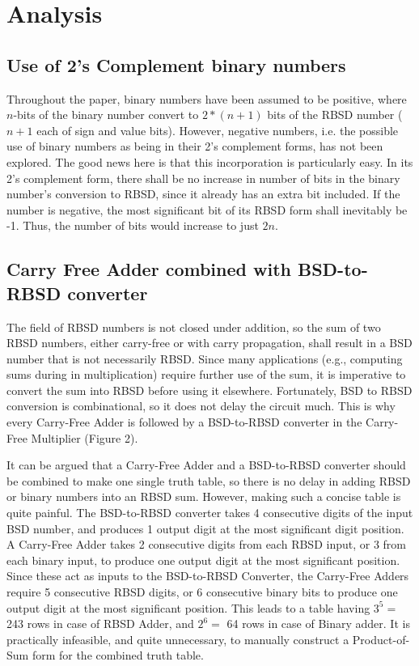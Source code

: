 \documentclass[conference]{IEEEtran_IBSS}
\begin{document}
\section{Analysis}

\subsection{Use of 2's Complement binary numbers}

Throughout the paper, binary numbers have been assumed to be positive, where $n$-bits of the binary number convert to $2*(n+1)$ bits of the RBSD number ($n+1$ each of sign and value bits). However, negative numbers, i.e. the possible use of binary numbers as being in their 2's complement forms, has not been explored. The good news here is that this incorporation is particularly easy. In its 2's complement form, there shall be no increase in number of bits in the binary number's conversion to RBSD, since it already has an extra bit included. If the number is negative, the most significant bit of its RBSD form shall inevitably be -1. Thus, the number of bits would increase to just $2n$.

\subsection{Carry Free Adder combined with BSD-to-RBSD converter}

The field of RBSD numbers is not closed under addition, so the sum of two RBSD numbers, either carry-free or with carry propagation, shall result in a BSD number that is not necessarily RBSD. Since many applications (e.g., computing sums during in multiplication) require further use of the sum, it is imperative to convert the sum into RBSD before using it elsewhere. Fortunately, BSD to RBSD conversion is combinational, so it does not delay the circuit much. This is why every Carry-Free Adder is followed by a BSD-to-RBSD converter in the Carry-Free Multiplier (Figure 2).

It can be argued that a Carry-Free Adder and a BSD-to-RBSD converter should be combined to make one single truth table, so there is no delay in adding RBSD or binary numbers into an RBSD sum. However, making such a concise table is quite painful. The BSD-to-RBSD converter takes 4 consecutive digits of the input BSD number, and produces 1 output digit at the most significant digit position. A Carry-Free Adder takes 2 consecutive digits from each RBSD input, or 3 from each binary input, to produce one output digit at the most significant position. Since these act as inputs to the BSD-to-RBSD Converter, the Carry-Free Adders require 5 consecutive RBSD digits, or 6 consecutive binary bits to produce one output digit at the most significant position. This leads to a table having $3^5 =$ 243 rows in case of RBSD Adder, and $2^6 =$ 64 rows in case of Binary adder. It is practically infeasible, and quite unnecessary, to manually construct a Product-of-Sum form for the combined truth table.
\end{document}

